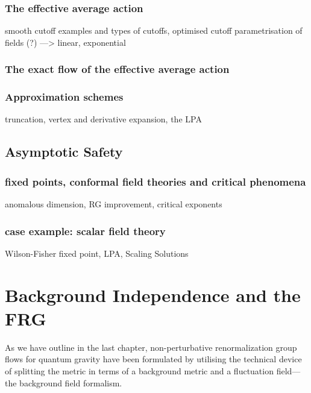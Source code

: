 \documentclass[11pt]{book} %
\numberwithin{equation}{chapter}
\begin{document}

\subsection{The effective average action}

smooth cutoff examples and types of cutoffs, optimised cutoff
parametrisation of fields (?) ---> linear, exponential

\subsection{The exact flow of the effective average action}

\subsection{Approximation schemes}
truncation, vertex and derivative expansion, the LPA

\section{Asymptotic Safety}

\subsection{fixed points, conformal field theories and critical phenomena}
anomalous dimension, RG improvement, critical exponents
\subsection{case example: scalar field theory}
Wilson-Fisher fixed point, LPA, Scaling Solutions




\chapter[Background Independence and the Functional Renormalisation Group]{Background Independence and the FRG}

As we have outline in the last chapter,
non-perturbative renormalization group flows for quantum gravity \cite{Reuter:1996cp}
have been formulated by utilising the technical device of splitting the metric in terms
of a background metric and a fluctuation field---the background field formalism.
\end{document}

